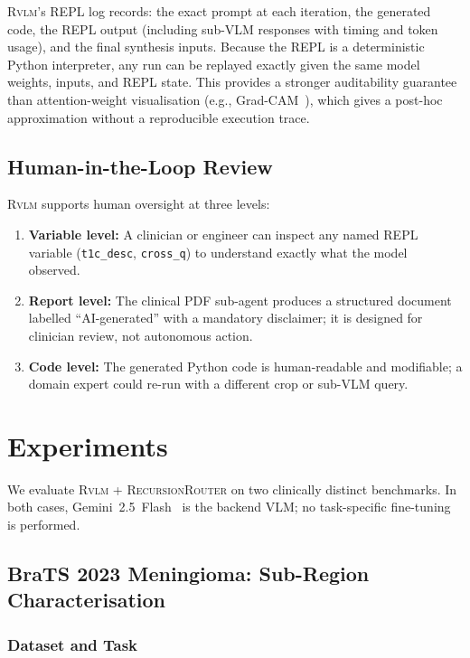 \documentclass{article}
\newcommand{\RVLM}{\textsc{Rvlm}}
\newcommand{\RRouter}{\textsc{RecursionRouter}}
\begin{document}
	\RVLM{}'s REPL log records: the exact prompt at each iteration, the generated
	code, the REPL output (including sub-VLM responses with timing and token
	usage), and the final synthesis inputs.
	Because the REPL is a deterministic Python interpreter, any run can be
	replayed exactly given the same model weights, inputs, and REPL state.
	This provides a stronger auditability guarantee than attention-weight
	visualisation (e.g., Grad-CAM~\citep{selvaraju2017gradcam}), which gives a
	post-hoc approximation without a reproducible execution trace.
	
	\subsection{Human-in-the-Loop Review}
	
	\RVLM{} supports human oversight at three levels:
	\begin{enumerate}[leftmargin=*,itemsep=2pt]
		\item \textbf{Variable level:} A clinician or engineer can inspect any
		named REPL variable (\texttt{t1c\_desc}, \texttt{cross\_q}) to
		understand exactly what the model observed.
		\item \textbf{Report level:} The clinical PDF sub-agent produces a
		structured document labelled ``AI-generated'' with a mandatory
		disclaimer; it is designed for clinician review, not autonomous action.
		\item \textbf{Code level:} The generated Python code is human-readable
		and modifiable; a domain expert could re-run with a different crop or
		sub-VLM query.
	\end{enumerate}
	
	
	\section{Experiments}
	\label{sec:experiments}
	
	We evaluate \RVLM{} + \RRouter{} on two clinically distinct benchmarks.
	In both cases, Gemini~2.5~Flash~\citep{team2024gemini} is the backend VLM;
	no task-specific fine-tuning is performed.
	
	\subsection{BraTS 2023 Meningioma: Sub-Region Characterisation}
	\label{sec:brats}
	
	\subsubsection*{Dataset and Task}
	
\end{document}

